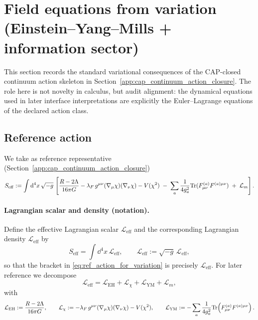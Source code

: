 \section{Field equations from variation (Einstein--Yang--Mills + information sector)}
\label{app:variational_field_equations}

This section records the standard variational consequences of the CAP-closed continuum action skeleton in Section~\ref{app:cap_continuum_action_closure}.
The role here is not novelty in calculus, but audit alignment: the dynamical equations used in later interface interpretations are explicitly the Euler--Lagrange equations of the declared action class.

\subsection{Reference action}
\label{subsec:ref_action_for_variation}

We take as reference representative (Section~\ref{app:cap_continuum_action_closure})
\begin{equation}
\label{eq:ref_action_for_variation}
S_{\mathrm{eff}}
:=\int \mathrm{d}^{4}x\,\sqrt{-g}\,
\left[
\frac{R-2\Lambda}{16\pi G}
-\lambda_F\, g^{\mu\nu}(\nabla_\mu\chi)(\nabla_\nu\chi)
-V(\chi^{2})
\;-\;\sum_{a}\frac{1}{4g_a^2}\mathrm{Tr}(F^{(a)}_{\mu\nu}F^{(a)\mu\nu})
\;+\;\mathcal{L}_{m}
\right].
\end{equation}

\paragraph{Lagrangian scalar and density (notation).}
Define the effective Lagrangian scalar $\mathcal{L}_{\mathrm{eff}}$ and the corresponding Lagrangian density $\mathscr{L}_{\mathrm{eff}}$ by
\begin{equation}
\label{eq:lagrangian_scalar_density_def}
S_{\mathrm{eff}}=\int \dd^4x\,\mathscr{L}_{\mathrm{eff}},
\qquad
\mathscr{L}_{\mathrm{eff}}:=\sqrt{-g}\,\mathcal{L}_{\mathrm{eff}},
\end{equation}
so that the bracket in \eqref{eq:ref_action_for_variation} is precisely $\mathcal{L}_{\mathrm{eff}}$.
For later reference we decompose
\begin{equation}
\label{eq:lagrangian_sector_decomposition}
\mathcal{L}_{\mathrm{eff}}
=\mathcal{L}_{\mathrm{EH}}+\mathcal{L}_{\chi}+\mathcal{L}_{\mathrm{YM}}+\mathcal{L}_m,
\end{equation}
with
\begin{equation}
\label{eq:lagrangian_sector_terms}
\mathcal{L}_{\mathrm{EH}}:=\frac{R-2\Lambda}{16\pi G},
\qquad
\mathcal{L}_{\chi}:=-\lambda_F\, g^{\mu\nu}(\nabla_\mu\chi)(\nabla_\nu\chi)-V(\chi^2),
\qquad
\mathcal{L}_{\mathrm{YM}}:=-\sum_a \frac{1}{4g_a^2}\mathrm{Tr}\!\left(F^{(a)}_{\mu\nu}F^{(a)\mu\nu}\right).
\end{equation}

